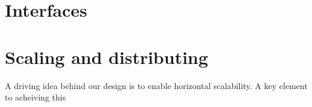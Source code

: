 \section{Interfaces}


\section{Scaling and distributing}
A driving idea behind our design is to enable horizontal
scalability. A key element to acheiving this


